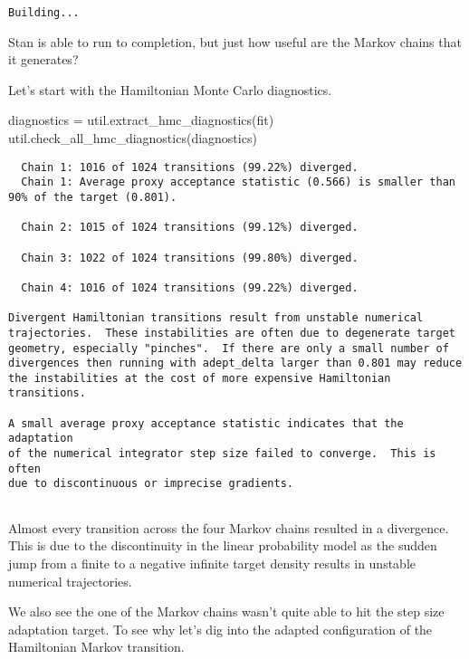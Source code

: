 \documentclass[
  letterpaper,
  DIV=11,
  numbers=noendperiod]{scrartcl}
\newenvironment{Shaded}{\begin{snugshade}}{\end{snugshade}}
\newcommand{\NormalTok}[1]{\textcolor[rgb]{0.00,0.23,0.31}{#1}}
\newcommand{\OperatorTok}[1]{\textcolor[rgb]{0.37,0.37,0.37}{#1}}
\begin{document}
\begin{verbatim}
Building...
\end{verbatim}

Stan is able to run to completion, but just how useful are the Markov
chains that it generates?

Let's start with the Hamiltonian Monte Carlo diagnostics.

\begin{Shaded}
\begin{Highlighting}[]
\NormalTok{diagnostics }\OperatorTok{=}\NormalTok{ util.extract\_hmc\_diagnostics(fit)}
\NormalTok{util.check\_all\_hmc\_diagnostics(diagnostics)}
\end{Highlighting}
\end{Shaded}

\begin{verbatim}
  Chain 1: 1016 of 1024 transitions (99.22%) diverged.
  Chain 1: Average proxy acceptance statistic (0.566) is smaller than
90% of the target (0.801).
 
  Chain 2: 1015 of 1024 transitions (99.12%) diverged.
 
  Chain 3: 1022 of 1024 transitions (99.80%) diverged.
 
  Chain 4: 1016 of 1024 transitions (99.22%) diverged.
 
Divergent Hamiltonian transitions result from unstable numerical
trajectories.  These instabilities are often due to degenerate target
geometry, especially "pinches".  If there are only a small number of
divergences then running with adept_delta larger than 0.801 may reduce
the instabilities at the cost of more expensive Hamiltonian transitions.
 
A small average proxy acceptance statistic indicates that the adaptation
of the numerical integrator step size failed to converge.  This is often
due to discontinuous or imprecise gradients.
 
\end{verbatim}

Almost every transition across the four Markov chains resulted in a
divergence. This is due to the discontinuity in the linear probability
model as the sudden jump from a finite to a negative infinite target
density results in unstable numerical trajectories.

We also see the one of the Markov chains wasn't quite able to hit the
step size adaptation target. To see why let's dig into the adapted
configuration of the Hamiltonian Markov transition.
\end{document}
